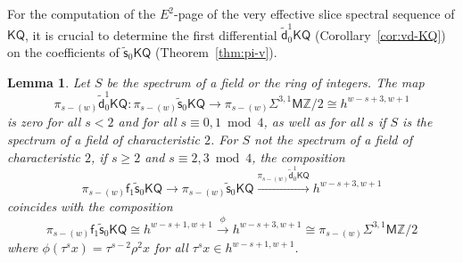 \documentclass[11pt,hyp,english]{article}
\newcommand{\Z}{\mathbb{Z}}
\newcommand{\KQ}{\mathsf{KQ}}
\newcommand{\MZ}{\mathsf{M}\Z}
\newcommand{\vs}{\tilde{\mathsf{s}}}
\newcommand{\f}{\mathsf{f}}
\newcommand{\vd}{{\tilde{\mathsf{d}}}}
\let\iso=\cong
\newtheorem{lemma}[theorem]{Lemma}
\theoremstyle{definition}
\begin{document}
For the computation of the $E^2$-page of the very effective slice spectral sequence of $\KQ$, it is crucial to determine the first differential $\vd^1_0 \KQ$ (Corollary~\ref{cor:vd-KQ}) on the coefficients of 
$\vs_0 \KQ$ (Theorem~\ref{thm:pi-v}).

\begin{lemma}\label{lem:vd-KQ-on-pi}
Let $S$ be the spectrum of a field or the ring of integers.
The map 
\[ \pi_{s-(w)}\vd^1_0\KQ \colon \pi_{s-(w)}\vs_{0}\KQ \to \pi_{s-(w)}\Sigma^{3,1}\MZ/2\iso h^{w-s+3,w+1}\]
is zero for all $s<2$ and for all $s\equiv 0,1 \bmod 4$, as well as for all $s$ if $S$ is the spectrum of a field of characteristic $2$.
For $S$ not the spectrum of a field of characteristic $2$, if $s\geq 2$ and $s\equiv 2,3 \bmod 4$, the composition
\[ \pi_{s-(w)}\f_1\vs_0\KQ \to \pi_{s-(w)}\vs_0\KQ \xrightarrow{\pi_{s-(w)}\vd^1_0\KQ} h^{w-s+3,w+1}\]
coincides with the composition
\[ \pi_{s-(w)}\f_1\vs_0\KQ \iso h^{w-s+1,w+1}\xrightarrow{\phi} h^{w-s+3,w+1}\iso \pi_{s-(w)}\Sigma^{3,1}\MZ/2\]
where $\phi(\tau^{s}x)=\tau^{s-2}\rho^2x$ for all $\tau^sx\in h^{w-s+1,w+1}$.
\end{lemma}
\end{document}
